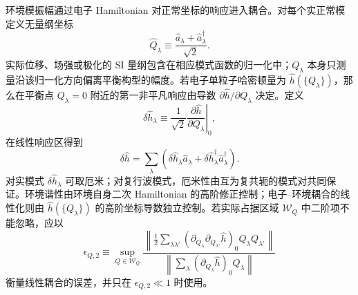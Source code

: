 环境模振幅通过电子 Hamiltonian 对正常坐标的响应进入耦合。对每个实正常模定义无量纲坐标
\begin{equation}
\boxed{
\hat Q_\lambda
\equiv
\frac{\hat a_\lambda+\hat a_\lambda^\dagger}{\sqrt2}.}
\label{eq:dimensionless_normal_coordinate_definition}
\end{equation}
实际位移、场强或极化的 SI 量纲包含在相应模式函数的归一化中；$Q_\lambda$ 本身只测量沿该归一化方向偏离平衡构型的幅度。若电子单粒子哈密顿量为 $\hat h(\{Q_\lambda\})$，那么在平衡点 $Q_\lambda=0$ 附近的第一非平凡响应由导数 $\partial\hat h/\partial Q_\lambda$ 决定。定义
\begin{equation*}
\delta\hat h_\lambda
\equiv
\frac1{\sqrt2}
\left.\frac{\partial\hat h}{\partial Q_\lambda}\right|_0,
\end{equation*}
在线性响应区得到
\begin{equation}
\boxed{
\delta\hat h
=\sum_\lambda
\left(
\delta\hat h_\lambda\hat a_\lambda
+\delta\hat h_\lambda^\dagger\hat a_\lambda^\dagger
\right).}
\label{eq:general_linear_mode_hamiltonian_variation}
\end{equation}
对实模式 $\delta\hat h_\lambda$ 可取厄米；对复行波模式，厄米性由互为复共轭的模式对共同保证。环境谐性由环境自身二次 Hamiltonian 的高阶修正控制；电子--环境耦合的线性化则由 $\hat h(\{Q_\lambda\})$ 的高阶坐标导数独立控制。若实际占据区域 $\mathcal W_Q$ 中二阶项不能忽略，应以
\begin{equation*}
\epsilon_{Q,2}
\equiv
\sup_{Q\in\mathcal W_Q}
\frac{\left\|\frac12\sum_{\lambda\lambda'}
(\partial_{Q_\lambda}\partial_{Q_{\lambda'}}\hat h)_0
Q_\lambda Q_{\lambda'}\right\|}
{\left\|\sum_\lambda(\partial_{Q_\lambda}\hat h)_0Q_\lambda\right\|}
\end{equation*}
衡量线性耦合的误差，并只在 $\epsilon_{Q,2}\ll1$ 时使用。

